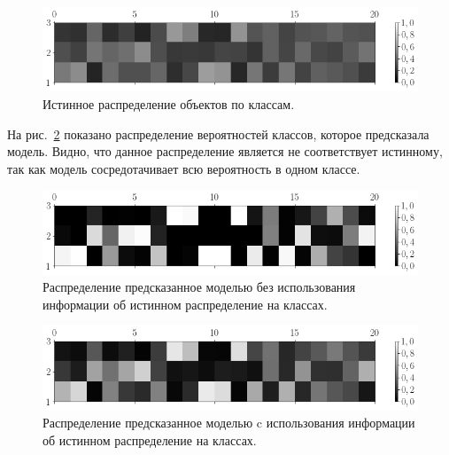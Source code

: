 \documentclass[12pt, twoside]{article}
\begin{document}
\begin{figure}[h!t]\center
\includegraphics[width=1\textwidth]{figures/syn_real_distr}
\caption{Истинное распределение  объектов по классам.}
\label{fg:ex:synt:distr:real}
\end{figure}


На рис.~\ref{fg:ex:synt:distr:without} показано распределение вероятностей классов, которое предсказала модель. Видно, что данное распределение является не соответствует истинному, так как модель сосредотачивает всю вероятность в одном классе.

\begin{figure}[h!t]\center
\includegraphics[width=1\textwidth]{figures/syn_without_teacher_distr}
\caption{Распределение предсказанное моделью без использования информации об истинном распределение на классах.}
\label{fg:ex:synt:distr:without}
\end{figure}

\begin{figure}[h!t]\center
\includegraphics[width=1\textwidth]{figures/syn_with_teacher_distr}
\caption{Распределение предсказанное моделью c использования информации об истинном распределение на классах.}
\label{fg:ex:synt:distr:with}
\end{figure}
\end{document}
